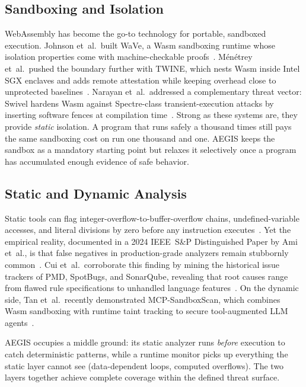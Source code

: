 \documentclass[conference]{IEEEtran}
\begin{document}
\subsection{Sandboxing and Isolation}

WebAssembly has become the go-to technology for portable,
sandboxed execution.  Johnson et~al.\ built WaVe, a Wasm
sandboxing runtime whose isolation properties come with
machine-checkable proofs~\cite{johnson2023wave}.
M\'en\'etrey et~al.\ pushed the boundary further with TWINE,
which nests Wasm inside Intel SGX enclaves and adds remote
attestation while keeping overhead close to unprotected
baselines~\cite{menetrey2024sgx}.  Narayan et~al.\ addressed
a complementary threat vector: Swivel hardens Wasm against
Spectre-class transient-execution attacks by inserting
software fences at compilation time~\cite{narayan2022swivel}.
Strong as these systems are, they provide \emph{static}
isolation.  A program that runs safely a thousand times still
pays the same sandboxing cost on run one thousand and one.
AEGIS keeps the sandbox as a mandatory starting point but
relaxes it selectively once a program has accumulated enough
evidence of safe behavior.

\subsection{Static and Dynamic Analysis}

Static tools can flag integer-overflow-to-buffer-overflow
chains, undefined-variable accesses, and literal divisions by
zero before any instruction executes~\cite{jiang2020elaid}.
Yet the empirical reality, documented in a 2024 IEEE~S\&P
Distinguished Paper by Ami et~al., is that false negatives in
production-grade analyzers remain stubbornly
common~\cite{ami2024false_neg}.  Cui et~al.\ corroborate this
finding by mining the historical issue trackers of PMD,
SpotBugs, and SonarQube, revealing that root causes range from
flawed rule specifications to unhandled language
features~\cite{huang2024static}.  On the dynamic side,
Tan et~al.\ recently demonstrated MCP-SandboxScan, which
combines Wasm sandboxing with runtime taint tracking to
secure tool-augmented LLM
agents~\cite{tan2025sandboxscan}.

AEGIS occupies a middle ground: its static analyzer runs
\emph{before} execution to catch deterministic patterns,
while a runtime monitor picks up everything the static layer
cannot see (data-dependent loops, computed overflows).
The two layers together achieve complete coverage within
the defined threat surface.
\end{document}
